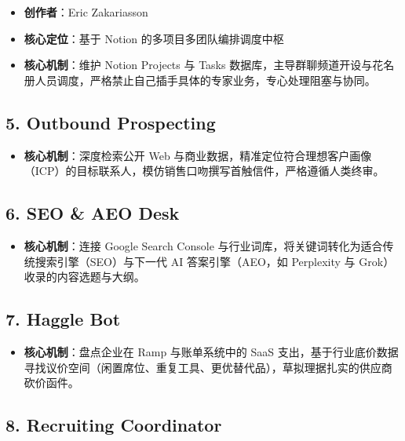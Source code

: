 \documentclass[10.5pt,a4paper,oneside]{report}
\providecommand{\tightlist}{\setlength{\itemsep}{0pt}\setlength{\parskip}{0pt}}
\begin{document}
\begin{itemize}
\tightlist
\item
  \textbf{创作者}：Eric Zakariasson
\item
  \textbf{核心定位}：基于 Notion 的多项目多团队编排调度中枢
\item
  \textbf{核心机制}：维护 Notion Projects 与 Tasks
  数据库，主导群聊频道开设与花名册人员调度，严格禁止自己插手具体的专家业务，专心处理阻塞与协同。
\end{itemize}

\subsection{5. Outbound Prospecting}\label{outbound-prospecting}

\begin{itemize}
\tightlist
\item
  \textbf{核心机制}：深度检索公开 Web
  与商业数据，精准定位符合理想客户画像（ICP）的目标联系人，模仿销售口吻撰写首触信件，严格遵循人类终审。
\end{itemize}

\subsection{6. SEO \& AEO Desk}\label{seo-aeo-desk}

\begin{itemize}
\tightlist
\item
  \textbf{核心机制}：连接 Google Search Console
  与行业词库，将关键词转化为适合传统搜索引擎（SEO）与下一代 AI
  答案引擎（AEO，如 Perplexity 与 Grok）收录的内容选题与大纲。
\end{itemize}

\subsection{7. Haggle Bot}\label{haggle-bot}

\begin{itemize}
\tightlist
\item
  \textbf{核心机制}：盘点企业在 Ramp 与账单系统中的 SaaS
  支出，基于行业底价数据寻找议价空间（闲置席位、重复工具、更优替代品），草拟理据扎实的供应商砍价函件。
\end{itemize}

\subsection{8. Recruiting Coordinator}\label{recruiting-coordinator}
\end{document}
